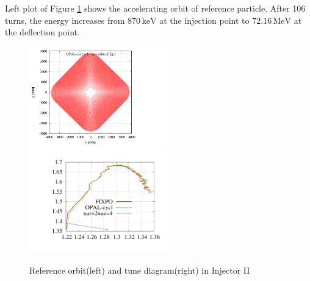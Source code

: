Left plot of Figure \ref{fig:Inj2 reference orbit and tune} shows the accelerating orbit of reference particle. After 106 turns, the energy increases from $870\,\mathrm{keV}$ at the injection point to $72.16\,\mathrm{MeV}$ at the deflection point. 
\vspace{0.5cm}
\begin{figure}[ht]
 \begin{center} 
   \includegraphics[width=6cm,trim=2.5cm 1.0cm 2.5cm 2.5cm]{figures/cyclotron/AEO_Injector2.png}
    \includegraphics[width=6cm,trim=2.5cm 2.5cm 2.5cm 2.5cm]{figures/cyclotron/nurnuz_Inj2}
    \caption{Reference orbit(left) and tune diagram(right) in Injector II  }
    \label{fig:Inj2 reference orbit and tune}
 \end{center}
\end{figure}

